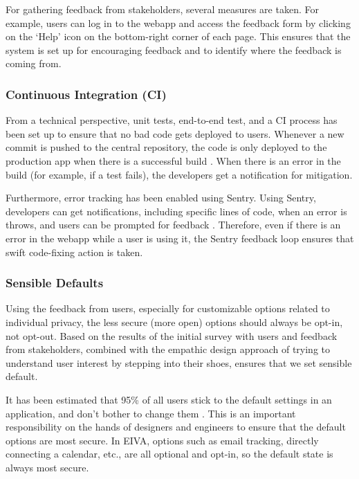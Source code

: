 \documentclass{article}
\begin{document}
For gathering feedback from stakeholders, several measures are taken. For example, users can log in to the webapp and access the feedback form by clicking on the `Help' icon on the bottom-right corner of each page. This ensures that the system is set up for encouraging feedback and to identify where the feedback is coming from.

\subsubsection{Continuous Integration (CI)}

From a technical perspective, unit tests, end-to-end test, and a CI process has been set up to ensure that no bad code gets deployed to users. Whenever a new commit is pushed to the central repository, the code is only deployed to the production app when there is a successful build \cite{noauthor_what_2019}. When there is an error in the build (for example, if a test fails), the developers get a notification for mitigation.

Furthermore, error tracking has been enabled using Sentry. Using Sentry, developers can get notifications, including specific lines of code, when an error is throws, and users can be prompted for feedback \cite{anser_sentry.io_2017}. Therefore, even if there is an error in the webapp while a user is using it, the Sentry feedback loop ensures that swift code-fixing action is taken.

\subsubsection{Sensible Defaults}

Using the feedback from users, especially for customizable options related to individual privacy, the less secure (more open) options should always be opt-in, not opt-out. Based on the results of the initial survey with users and feedback from stakeholders, combined with the empathic design approach of trying to understand user interest by stepping into their shoes, ensures that we set sensible default.

It has been estimated that 95\% of all users stick to the default settings in an application, and don't bother to change them \cite{catalanotto_95_2019}. This is an important responsibility on the hands of designers and engineers to ensure that the default options are most secure. In EIVA, options such as email tracking, directly connecting a calendar, etc., are all optional and opt-in, so the default state is always most secure.
\end{document}

